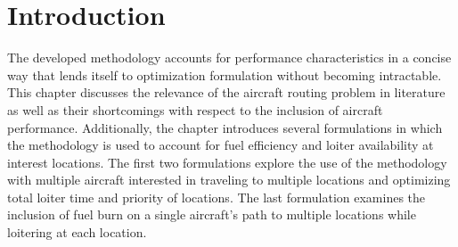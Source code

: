 \section{Introduction}
The developed methodology accounts for performance characteristics in a concise way that lends itself to optimization formulation without becoming intractable. This chapter discusses the relevance of the aircraft routing problem in literature as well as their shortcomings with respect to the inclusion of aircraft performance. Additionally, the chapter introduces several formulations in which the methodology is used to account for fuel efficiency and loiter availability at interest locations. The first two formulations explore the use of the methodology with multiple aircraft interested in traveling to multiple locations and optimizing total loiter time and priority of locations. The last formulation examines the inclusion of fuel burn on a single aircraft's path to multiple locations while loitering at each location.
